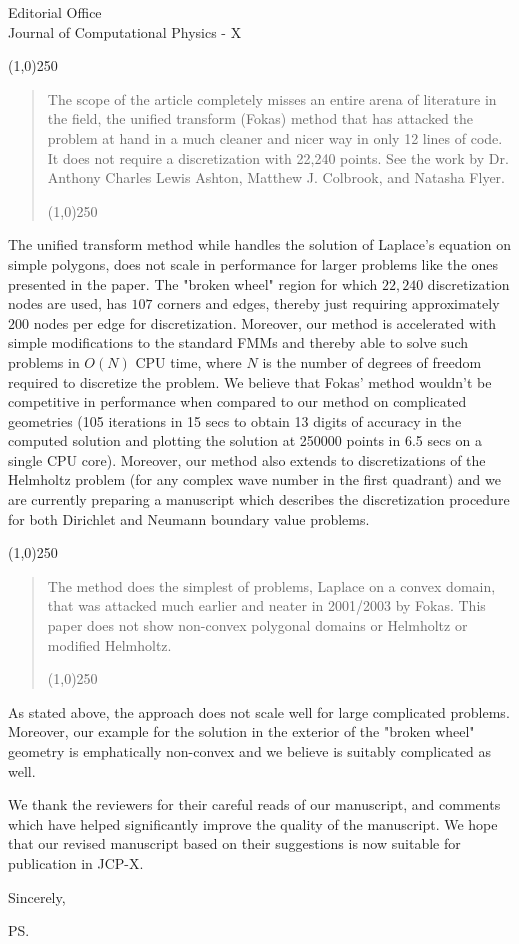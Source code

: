 \documentclass[11pt]{letter}
\newcommand\qa{\begin{center}\line(1,0){250}\end{center}\begin{quote}\begin{em}}
\newcommand\qb{\end{em}\begin{center}\line(1,0){250}\end{center}\end{quote}}
\begin{document}
\begin{letter}{Editorial Office\\
Journal of Computational Physics - X}
\qa

The scope of the article completely misses an entire arena of literature in the field, the unified transform (Fokas) method that has attacked the problem at hand in a much cleaner and nicer way in only 12 lines of code. It does not require a discretization with 22,240 points. See the work by Dr. Anthony Charles Lewis Ashton, Matthew J. Colbrook, and Natasha Flyer.

\qb

The unified transform method while handles the solution of Laplace's equation on simple polygons, does not scale in performance for larger problems like the ones presented in the paper. The "broken wheel" region for which $22,240$ discretization nodes are used, has $107$
corners and edges, thereby just requiring approximately $200$ nodes per edge for discretization. Moreover, our method is accelerated with simple modifications to the standard FMMs and thereby able to solve such problems in $O(N)$ CPU time, where $N$ is the number of degrees of freedom required to discretize the problem. We believe that Fokas' method wouldn't be competitive in performance when compared to our method on complicated geometries (105 iterations in 15 secs to obtain 13 digits of accuracy in the computed solution and plotting the solution at 250000 points in 6.5 secs on a single CPU core).
Moreover, our method also extends to discretizations of the Helmholtz problem (for any complex wave number in the first quadrant) and we are currently preparing a manuscript which describes the discretization procedure for both Dirichlet and Neumann boundary value problems. 
\qa

The method does the simplest of problems, Laplace on a convex domain, that was attacked much earlier and neater in 2001/2003 by Fokas. This paper does not show non-convex polygonal domains or Helmholtz or modified Helmholtz.

\qb

As stated above, the approach does not scale well for large complicated problems. Moreover, our example for the solution in the exterior of the "broken wheel" geometry is emphatically non-convex and we believe is suitably complicated as well. 




We thank the reviewers for their careful reads of our manuscript, and comments 
which have helped significantly improve the quality of the manuscript.
We hope that our revised manuscript based on their suggestions is now
suitable for publication in JCP-X.


\closing{Sincerely,}

\ps


\end{letter}
\end{document}
